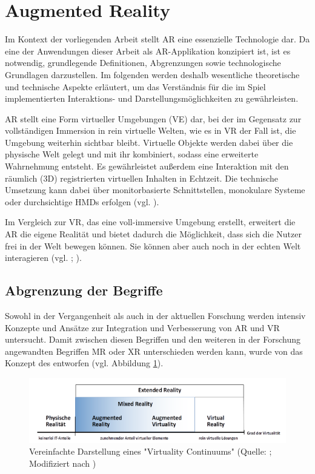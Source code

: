 \section{Augmented Reality}
Im Kontext der vorliegenden Arbeit stellt \ac{AR} eine essenzielle Technologie dar. Da eine der Anwendungen dieser Arbeit als \ac{AR}-Applikation konzipiert ist, ist es notwendig, grundlegende Definitionen, Abgrenzungen sowie technologische Grundlagen darzustellen. Im folgenden werden deshalb wesentliche theoretische und technische Aspekte erläutert, um das Verständnis für die im Spiel implementierten Interaktions- und Darstellungsmöglichkeiten zu gewährleisten.

\ac{AR} stellt eine Form virtueller Umgebungen (\ac{VE}) dar, bei der im Gegensatz zur vollständigen Immersion in rein virtuelle Welten, wie es in \ac{VR} der Fall ist, die Umgebung weiterhin sichtbar bleibt. Virtuelle Objekte werden dabei über die physische Welt gelegt und mit ihr kombiniert, sodass eine erweiterte Wahrnehmung entsteht. Es gewährleistet außerdem eine Interaktion mit den räumlich (\ac{3D}) registrierten virtuellen Inhalten in Echtzeit. Die technische Umsetzung kann dabei über monitorbasierte Schnittstellen, monokulare Systeme oder durchsichtige \ac{HMD}s erfolgen (vgl. \citealp[S. 2f]{azuma_survey_1997}).

Im Vergleich zur \ac{VR}, das eine voll-immersive Umgebung erstellt, erweitert die \ac{AR} die eigene Realität und bietet dadurch die Möglichkeit, dass sich die Nutzer frei in der Welt bewegen können. Sie können aber auch noch in der echten Welt interagieren (vgl. \citealp[S. 79]{billinghurst_survey_2015}; \citealp[S. 1]{stefanidi_meaningful_2024}).

\subsection{Abgrenzung der Begriffe}
Sowohl in der Vergangenheit als auch in der aktuellen Forschung werden intensiv Konzepte und Ansätze zur Integration und Verbesserung von \ac{AR} und \ac{VR} untersucht. Damit zwischen diesen Begriffen und den weiteren in der Forschung angewandten Begriffen \ac{MR} oder \ac{XR} unterschieden werden kann, wurde von  \cite{milgram_taxonomy_1994} das Konzept des  entworfen (vgl. Abbildung \ref{fig:virtuality-continuum}).

\begin{figure}[ht]
\centering
\includegraphics[width=1\linewidth]{content/pictures/virtuality-continuum_upscaled.PNG}
\caption{Vereinfachte Darstellung eines "Virtuality Continuums" (Quelle: \citealp[S. 9]{knoll_augmented_2022}; Modifiziert nach \citealp[S. 3]{milgram_taxonomy_1994})}
\label{fig:virtuality-continuum}
\end{figure}

